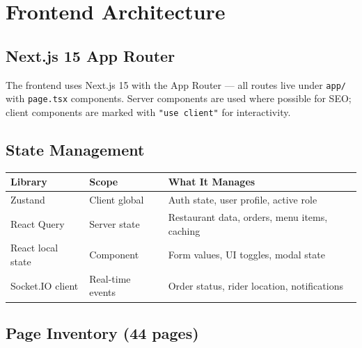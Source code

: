 \documentclass[11pt,a4paper,twoside]{book}
\newcommand{\th}[1]{\textbf{\color{white}#1}}
\begin{document}
\chapter{Frontend Architecture}

\section{Next.js 15 App Router}

The frontend uses Next.js 15 with the App Router — all routes live under
\texttt{app/} with \texttt{page.tsx} components.  Server components are used
where possible for SEO; client components are marked with \texttt{"use client"}
for interactivity.

\section{State Management}

\begin{center}\small
\begin{tabular}{p{3cm}p{4cm}p{6cm}}
\toprule
\rowcolor{headbg}\th{Library} & \th{Scope} & \th{What It Manages} \\
\midrule
Zustand          & Client global     & Auth state, user profile, active role \\
\rowcolor{rowalt}React Query      & Server state      & Restaurant data, orders, menu items, caching \\
React local state & Component        & Form values, UI toggles, modal state \\
\rowcolor{rowalt}Socket.IO client & Real-time events  & Order status, rider location, notifications \\
\bottomrule
\end{tabular}
\end{center}

\section{Page Inventory (44 pages)}
\end{document}
